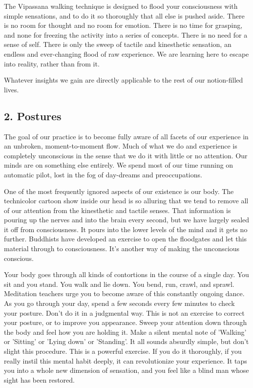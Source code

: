 The Vipassana walking technique is designed to flood your consciousness with
simple sensations, and to do it so thoroughly that all else is pushed aside.
There is no room for thought and no room for emotion. There is no time for
grasping, and none for freezing the activity into a series of concepts. There is
no need for a sense of self. There is only the sweep of tactile and kinesthetic
sensation, an endless and ever-changing flood of raw experience. We are learning
here to escape into reality, rather than from it.

Whatever insights we gain are directly applicable to the rest of our
notion-filled lives.
\subsection*{2. Postures}
The goal of our practice is to become fully aware of all facets of our experience in an unbroken, moment-to-moment flow. Much of
what we do and experience is completely unconscious in the sense that we do it with little or no attention. Our minds are on
something else entirely. We spend most of our time running on automatic pilot, lost in the fog of day-dreams and preoccupations.

One of the most frequently ignored aspects of our existence is our body. The
technicolor cartoon show inside our head is so alluring that we tend to remove
all of our attention from the kinesthetic and tactile senses. That information
is pouring up the nerves and into the brain every second, but we have largely
sealed it off from consciousness. It pours into the lower levels of the mind and
it gets no further. Buddhists have developed an exercise to open the floodgates
and let this material through to consciousness. It's another way of making the
unconscious conscious.

Your body goes through all kinds of contortions in the course of a single day.
You sit and you stand. You walk and lie down.
You bend, run, crawl, and sprawl. Meditation teachers urge you to become aware of this constantly ongoing dance. As you go
through your day, spend a few seconds every few minutes to check your posture. Don't do it in a judgmental way. This is not an
exercise to correct your posture, or to improve you appearance. Sweep your attention down through the body and feel how you are
holding it. Make a silent mental note of 'Walking' or 'Sitting' or 'Lying down' or 'Standing'. It all sounds absurdly simple, but
don't slight this procedure. This is a powerful exercise. If you do it thoroughly, if you really instil this mental habit deeply, it can
revolutionize your experience. It taps you into a whole new dimension of sensation, and you feel like a blind man whose sight has
been restored.

